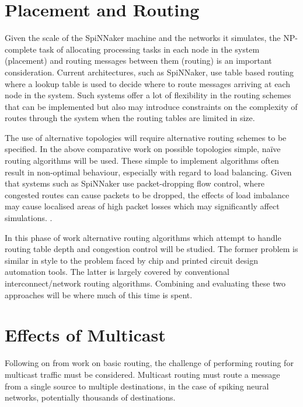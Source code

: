 	\section{Placement and Routing}
		
		Given the scale of the SpiNNaker machine and the networks it simulates, the
		NP-complete task of allocating processing tasks in each node in the system
		(placement) and routing messages between them (routing) is an important
		consideration. Current architectures, such as SpiNNaker, use table based
		routing where a lookup table is used to decide where to route messages
		arriving at each node in the system. Such systems offer a lot of flexibility
		in the routing schemes that can be implemented but also may introduce
		constraints on the complexity of routes through the system when the routing
		tables are limited in size.
		
		The use of alternative topologies will require alternative routing schemes
		to be specified. In the above comparative work on possible topologies
		simple, na\"ive routing algorithms will be used. These simple to implement
		algorithms often result in non-optimal behaviour, especially with regard to
		load balancing\cite{dally04}. Given that systems such as SpiNNaker use
		packet-dropping flow control, where congested routes can cause packets to be
		dropped, the effects of load imbalance may cause localised areas of high
		packet losses which may significantly affect simulations.
		\cite{greenfield10}.
		
		In this phase of work alternative routing algorithms which attempt to handle
		routing table depth and congestion control will be studied. The former
		problem is similar in style to the problem faced by chip and printed circuit
		design automation tools. The latter is largely covered by conventional
		interconnect/network routing algorithms. Combining and evaluating these two
		approaches will be where much of this time is spent.
	
	\section{Effects of Multicast}
		
		Following on from work on basic routing, the challenge of performing routing
		for multicast traffic must be considered. Multicast routing must route a
		message from a single source to multiple destinations, in the case of
		spiking neural networks, potentially thousands of destinations.
		
